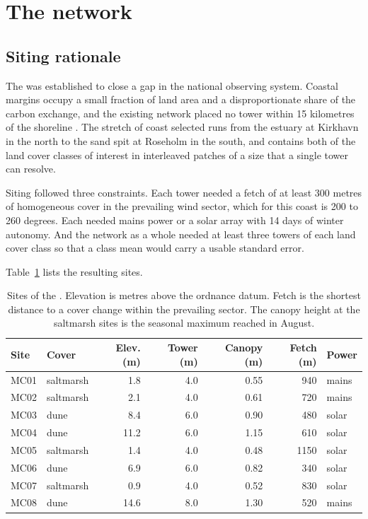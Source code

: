 \section{The network}
\label{sec:network}

\subsection{Siting rationale}
\label{sec:network-siting}

The \network{} was established to close a gap in the national observing system.
Coastal margins occupy a small fraction of land area and a disproportionate
share of the carbon exchange, and the existing network placed no tower within
15 kilometres of the shoreline \citep{sandvik2021coastalgap}. The stretch of
coast selected runs from the estuary at Kirkhavn in the north to the sand spit
at Roseholm in the south, and contains both of the land cover classes of
interest in interleaved patches of a size that a single tower can resolve.

Siting followed three constraints. Each tower needed a fetch of at least 300
metres of homogeneous cover in the prevailing wind sector, which for this coast
is 200 to 260 degrees. Each needed mains power or a solar array with 14 days of
winter autonomy. And the network as a whole needed at least three towers of each
land cover class so that a class mean would carry a usable standard error.

Table~\ref{tab:site-summary} lists the resulting sites.

\begin{table}[t]
\centering
\small
\caption{Sites of the \network. Elevation is metres above the ordnance datum.
Fetch is the shortest distance to a cover change within the prevailing sector.
The canopy height at the saltmarsh sites is the seasonal maximum reached in
August.}
\label{tab:site-summary}
\begin{tabular}{llrrrrl}
\toprule
Site & Cover & Elev. (m) & Tower (m) & Canopy (m) & Fetch (m) & Power \\
\midrule
MC01 & saltmarsh & 1.8  & 4.0 & 0.55 & 940  & mains \\
MC02 & saltmarsh & 2.1  & 4.0 & 0.61 & 720  & mains \\
MC03 & dune      & 8.4  & 6.0 & 0.90 & 480  & solar \\
MC04 & dune      & 11.2 & 6.0 & 1.15 & 610  & solar \\
MC05 & saltmarsh & 1.4  & 4.0 & 0.48 & 1150 & solar \\
MC06 & dune      & 6.9  & 6.0 & 0.82 & 340  & solar \\
MC07 & saltmarsh & 0.9  & 4.0 & 0.52 & 830  & solar \\
MC08 & dune      & 14.6 & 8.0 & 1.30 & 520  & mains \\
\bottomrule
\end{tabular}
\end{table}

